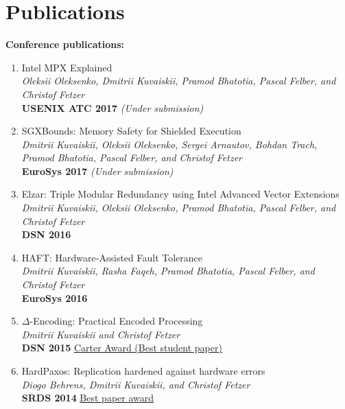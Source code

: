 \documentclass[letterpaper]{article}
\renewenvironment{itemize}{
  \begin{list}{}{
    \setlength{\leftmargin}{1.5em}
  }
}{
  \end{list}
}
\begin{document}
\section*{Publications}

{\bf Conference publications:}
\begin{enumerate} [label= $\lbrack$\arabic*$\rbrack$, resume]
\item Intel MPX Explained\\
{\em Oleksii Oleksenko, {Dmitrii Kuvaiskii}, Pramod Bhatotia,  Pascal Felber, and Christof Fetzer}\\
{\bf USENIX ATC 2017} {\em (Under submission)}

\item SGXBounds: Memory Safety for Shielded Execution\\
{\em Dmitrii Kuvaiskii, Oleksii Oleksenko, Sergei Arnautov, Bohdan Trach, Pramod Bhatotia, Pascal Felber, and Christof Fetzer}\\
{\bf  EuroSys 2017} {\em (Under submission)}

\item Elzar: Triple Modular Redundancy using Intel Advanced Vector Extensions\\
{\em Dmitrii Kuvaiskii, Oleksii Oleksenko, Pramod Bhatotia, Pascal Felber, and  Christof Fetzer}\\
{\bf  DSN 2016}


\item HAFT: Hardware-Assisted Fault Tolerance\\
{\em Dmitrii Kuvaiskii, Rasha Faqeh, Pramod Bhatotia, Pascal Felber, and  Christof Fetzer}\\
{\bf  EuroSys 2016}


\item $\Delta$-Encoding: Practical Encoded Processing\\
{\em Dmitrii Kuvaiskii and Christof Fetzer}\\
{\bf   DSN 2015} \underline{Carter Award (Best student paper)}


\item HardPaxos: Replication hardened against hardware errors\\
{\em Diogo Behrens, {Dmitrii Kuvaiskii}, and Christof Fetzer}\\
{\bf SRDS 2014} \underline{Best paper award}

\end{enumerate}
\end{document}
